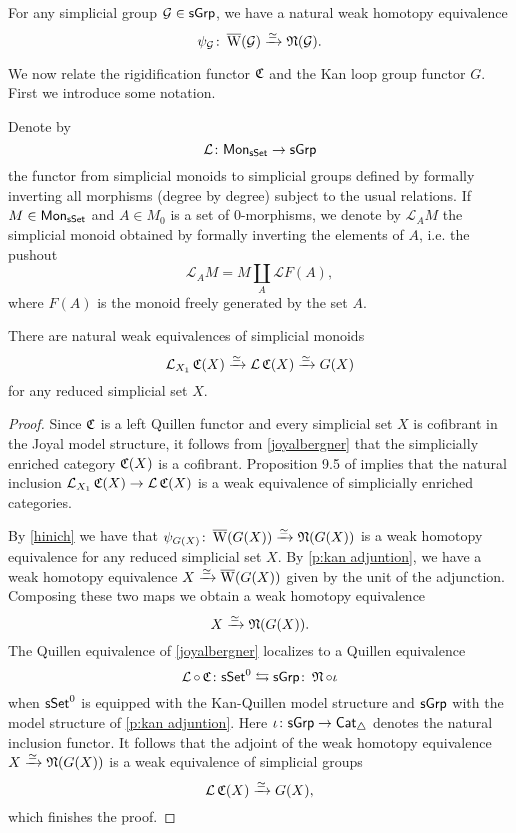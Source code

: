 \begin{proposition} \label{hinich}
	For any simplicial group $\mathcal{G} \in \mathsf{sGrp}$, we have a natural weak homotopy equivalence
	$$\psi_{\mathcal{G}} \colon \operatorname{\overline{W}}(\mathcal{G}) \xrightarrow{\simeq} \operatorname{\mathfrak{N}}(\mathcal{G}).$$
\end{proposition} 

We now relate the rigidification functor $\operatorname{\mathfrak{C}}$ and the Kan loop group functor $G$. First we introduce some notation. 

Denote by 
\[\mathcal{L} \colon \mathsf{Mon}_{\mathsf{sSet}} \to \mathsf{sGrp} \]
the functor from simplicial monoids to simplicial groups defined by formally inverting all morphisms (degree by degree) subject to the usual relations. If $M \in \mathsf{Mon}_{\mathsf{sSet}}$ and $A \in M_0$ is a set of $0$-morphisms, we denote by $\mathcal{L}_AM$ the simplicial monoid obtained by formally inverting the elements of $A$, i.e. the pushout
\[ \mathcal{L}_AM= M \coprod_A \mathcal{L}F(A), \]
where $F(A)$ is the monoid freely generated by the set $A$. 

\begin{lemma} \label{CandG}
	There are natural weak equivalences of simplicial monoids
	\begin{equation*}
	\operatorname{\mathcal{L}}_{X_1} \operatorname{\mathfrak{C}}(X) \xrightarrow{\simeq} \operatorname{\mathcal{L}}\operatorname{\mathfrak{C}}(X) \xrightarrow{\simeq} G(X)
	\end{equation*}
	for any reduced simplicial set $X$.
\end{lemma}

\begin{proof}
	Since $\operatorname{\mathfrak{C}}$ is a left Quillen functor and every simplicial set $X$ is cofibrant in the Joyal model structure, it follows from \cref{joyalbergner} that the simplicially enriched category $\operatorname{\mathfrak{C}}(X)$ is a cofibrant.
	Proposition 9.5 of \cite{dwyer1980simplicial} implies that the natural inclusion $\operatorname{\mathcal{L}}_{X_1} \operatorname{\mathfrak{C}}(X) \to \operatorname{\mathcal{L}}\operatorname{\mathfrak{C}}(X)$ is a weak equivalence of simplicially enriched categories.
	
	By \cref{hinich} we have that $\psi_{G(X)} \colon \operatorname{\overline{W}}(G(X)) \xrightarrow{\simeq} \operatorname{\mathfrak{N}}(G(X))$ is a weak homotopy equivalence for any reduced simplicial set $X$.
	By \cref{p:kan adjuntion}, we have a weak homotopy equivalence $X \xrightarrow{\simeq} \operatorname{\overline{W}}(G(X))$ given by the unit of the adjunction.
	Composing these two maps we obtain a weak homotopy equivalence
	$$X \xrightarrow{\simeq} \operatorname{\mathfrak{N}}(G(X)).$$
	The Quillen equivalence of \cref{joyalbergner} localizes to a Quillen equivalence
	$$\operatorname{\mathcal{L}} \circ \operatorname{\mathfrak{C}} \colon \mathsf{sSet}^0 \leftrightarrows \mathsf{sGrp} \colon \operatorname{\mathfrak{N}} \circ \iota$$
	when $\mathsf{sSet}^0$ is equipped with the Kan-Quillen model structure and $\mathsf{sGrp}$ with the model structure of \cref{p:kan adjuntion}.
	Here $\iota \colon \mathsf{sGrp} \to \mathsf{Cat}_{\triangle}$ denotes the natural inclusion functor.
	It follows that the adjoint of the weak homotopy equivalence $X \xrightarrow{\simeq} \operatorname{\mathfrak{N}}(G(X))$ is a weak equivalence of simplicial groups
	$$\operatorname{\mathcal{L}}\operatorname{\mathfrak{C}}(X) \xrightarrow{\simeq} G(X),$$
	which finishes the proof.
\end{proof}

